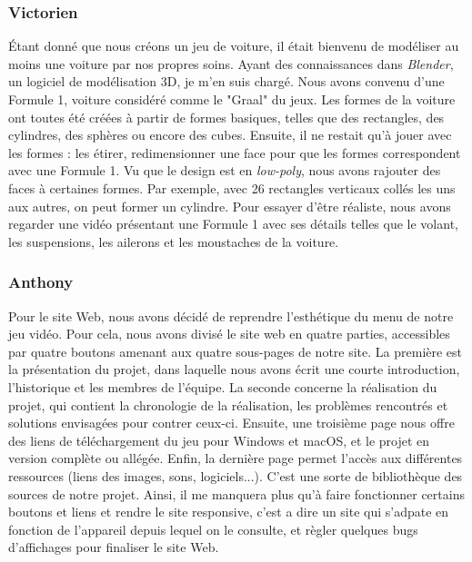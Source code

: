\documentclass[a4paper,12pt]{article}
\begin{document}
    \subsubsection{Victorien}
        Étant donné que nous créons un jeu de voiture, il était 
        bienvenu de modéliser au moins une voiture par nos propres soins. 
        Ayant des connaissances dans \textsl{Blender}, un logiciel 
        de modélisation 3D, je m'en suis chargé. 
        Nous avons convenu d'une Formule 1, voiture considéré comme le "Graal" du jeux. 
        Les formes de la voiture ont toutes été créées à partir de formes basiques,
        telles que des rectangles, des cylindres, des sphères ou
        encore des cubes. 
        Ensuite, il ne restait qu'à jouer avec les formes : les étirer, 
        redimensionner une face pour que les formes correspondent avec une Formule 1. 
        Vu que le design est en \textit{low-poly}, nous avons rajouter des
        faces à certaines formes. Par exemple, avec 26 rectangles verticaux collés les 
        uns aux autres, on peut former un cylindre.
        Pour essayer d'être réaliste, nous avons regarder une 
        vidéo présentant une Formule 1 avec ses détails telles que le volant, 
        les suspensions, les ailerons et les moustaches de la voiture.

    \subsubsection{Anthony}
        Pour le site Web, nous avons décidé de reprendre l'esthétique du
        menu de notre jeu vidéo. Pour cela, nous avons divisé le site web 
        en quatre parties, accessibles par quatre boutons amenant aux quatre 
        sous-pages de notre site. La première est la présentation du projet, dans laquelle
        nous avons écrit une courte introduction, l'historique et les membres
        de l'équipe. La seconde concerne la réalisation du projet, qui contient
        la chronologie de la réalisation, les problèmes rencontrés et solutions
        envisagées pour contrer ceux-ci. Ensuite, une troisième page nous 
        offre des liens de téléchargement du jeu pour Windows et macOS, et
        le projet en version complète ou allégée.
        Enfin, la dernière page permet l'accès aux différentes ressources
        (liens des images, sons, logiciels...). C'est une sorte de bibliothèque 
        des sources de notre projet.
        Ainsi, il me manquera plus qu'à faire fonctionner certains boutons et 
        liens et rendre le site responsive, c'est a dire un site qui s'adpate en 
        fonction de l'appareil depuis lequel on le consulte, et 
        règler quelques bugs d'affichages pour finaliser le site Web. 
\end{document}
